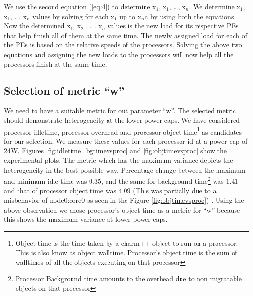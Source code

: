   We use the second equation (\ref{eq:4}) to determine x$_1$, x$_1$, \dots,
  x$_n$. We determine x$_1$, x$_1$,
  \dots, x$_n$ values by solving for each x$_1$ up to x$_n$n by using both the
  equations. Now the determined x$_1$, x$_2$ . . . x$_n$ values is the new load
  for its respective PEs that help finish all of them at the same time. The
  newly assigned load for each of the PEs is based on the relative speeds of
  the processors. Solving the above two equations and assigning the new loads
  to the processors will now help all the processors finish at the same time.

\subsection{Selection of metric ``w''} 
We need to have a suitable metric for out parameter ``w''.  The selected metric
should demonstrate heterogeneity at the lower power caps. We have considered
processor idletime, processor overhead and processor object
time\footnote{Object time is the time taken by a charm++ object to run on a
  processor. This is also know as object walltime. Processor's object time is
    the sum of walltimes of all the objects executing on that processor} as
    candidates for our selection.  We measure these values for each processor
    id at a power cap of 24W.  Figures \ref{fig:idletime_bgtimevsproc} and
    \ref{fig:objtimevsproc} show the experimental plots.  The metric which has
    the maximum variance depicts the heterogeneity in the best possible way.
    Percentage change between the maximum and minimum idle time was $0.35$, and
    the same for background time\footnote{Processor Background time amounts to
      the overhead due to non migratable objects on that processor} was $1.41$
      and that of processor object time was $4.09$ (This was partially due to a
          misbehavior of node0:core0 as seen in the Figure
          \ref{fig:objtimevsproc}) .  Using the above observation we chose
      processor's object time as a metric for ``w'' because this shows the
      maximum variance at lower power caps. 
   

